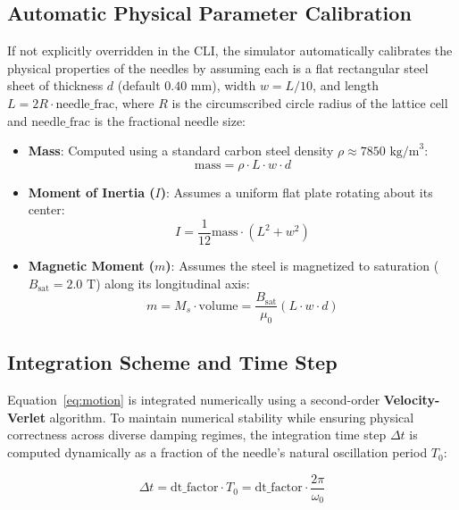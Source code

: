 \documentclass[11pt,a4paper]{article}
\begin{document}
\subsection{Automatic Physical Parameter Calibration}
If not explicitly overridden in the CLI, the simulator automatically calibrates the physical properties of the needles by assuming each is a flat rectangular steel sheet of thickness $d$ (default $0.40\text{ mm}$), width $w = L / 10$, and length $L = 2R \cdot \text{needle\_frac}$, where $R$ is the circumscribed circle radius of the lattice cell and $\text{needle\_frac}$ is the fractional needle size:
\begin{itemize}
    \item \textbf{Mass}: Computed using a standard carbon steel density $\rho \approx 7850\text{ kg/m}^3$:
    \begin{equation}
    \text{mass} = \rho \cdot L \cdot w \cdot d
    \end{equation}
    \item \textbf{Moment of Inertia ($I$)}: Assumes a uniform flat plate rotating about its center:
    \begin{equation}
    I = \frac{1}{12} \text{mass} \cdot (L^2 + w^2)
    \end{equation}
    \item \textbf{Magnetic Moment ($m$)}: Assumes the steel is magnetized to saturation ($B_{\text{sat}} = 2.0\text{ T}$) along its longitudinal axis:
    \begin{equation}
    m = M_s \cdot \text{volume} = \frac{B_{\text{sat}}}{\mu_0} (L \cdot w \cdot d)
    \end{equation}
\end{itemize}

\subsection{Integration Scheme and Time Step}
Equation~\eqref{eq:motion} is integrated numerically using a second-order \textbf{Velocity-Verlet} algorithm. To maintain numerical stability while ensuring physical correctness across diverse damping regimes, the integration time step $\Delta t$ is computed dynamically as a fraction of the needle's natural oscillation period $T_0$:

\begin{equation}
\Delta t = \text{dt\_factor} \cdot T_0 = \text{dt\_factor} \cdot \frac{2\pi}{\omega_0}
\end{equation}
\end{document}
